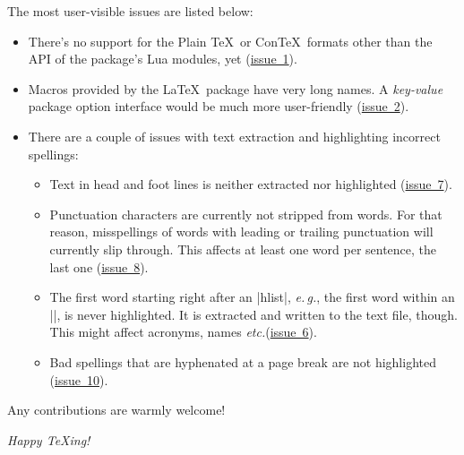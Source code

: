\documentclass[11pt]{article}
\newcommand*{\acr}[1]{\mbox{\scshape#1}}
\newcommand*{\latinphrase}[1]{\foreignlanguage{latin}{\emph{#1}}}
\newcommand*{\lpeg}{\latinphrase{e.\,g.}\xspace}
\newcommand*{\lpetc}{\latinphrase{etc.}\xspace}
\begin{document}
The most user-visible issues are listed below:

\begin{itemize}

\item There's no support for the Plain \TeX\ or Con\TeX\ formats other
  than the \acr{API} of the package's Lua modules, yet
  (\href{https://github.com/sh2d/spelling/issues/1}{issue~1}).

\item Macros provided by the \LaTeX\ package have very long names.  A
  \emph{key-value} package option interface would be much more
  user-friendly
  (\href{https://github.com/sh2d/spelling/issues/2}{issue~2}).

\item There are a couple of issues with text extraction and highlighting
  incorrect spellings:

  \begin{itemize}

  \item Text in head and foot lines is neither extracted nor highlighted
    (\href{https://github.com/sh2d/spelling/issues/7}{issue~7}).

  \item Punctuation characters are currently not stripped from words.
    For that reason, misspellings of words with leading or trailing
    punctuation will currently slip through.  This affects at least one
    word per sentence, the last one
    (\href{https://github.com/sh2d/spelling/issues/8}{issue~8}).

  \item The first word starting right after an |hlist|, \lpeg, the first
    word within an |\mbox|, is never highlighted.  It is extracted and
    written to the text file, though.  This might affect acronyms, names
    \lpetc (\href{https://github.com/sh2d/spelling/issues/6}{issue~6}).

  \item Bad spellings that are hyphenated at a page break are not
    highlighted
    (\href{https://github.com/sh2d/spelling/issues/10}{issue~10}).

  \end{itemize}


\end{itemize}

Any contributions are warmly welcome!

\bigskip
\emph{Happy \TeX ing!}
\end{document}
